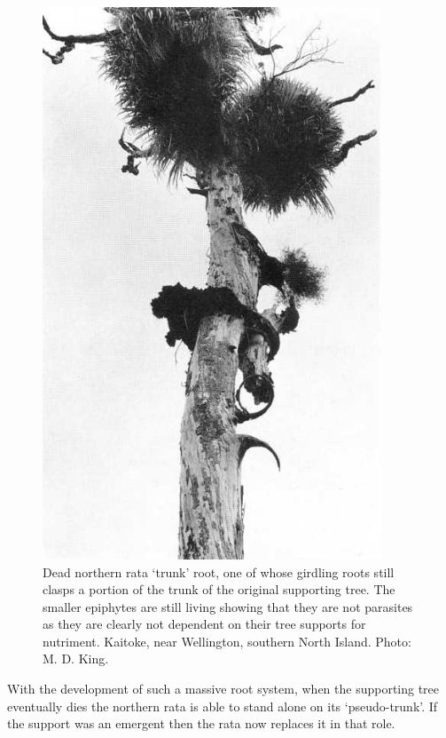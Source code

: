 \begin{figure}[htb]
\begin{minipage}[t]{0.455\textwidth}
    	\includegraphics[width=0.9\textwidth]{graphics/figure53dead-rata.jpg}
    	\caption[Dead northern rata `trunk' root]{Dead northern rata `trunk' root, one of whose girdling roots still clasps a portion of the trunk of the original supporting tree.
    	The smaller epiphytes are still living showing that they are not parasites as they are clearly not dependent on their tree supports for nutriment.
    	Kaitoke, near Wellington, southern North Island.
    	Photo: M. D. King.}%
    	\label{fig:53dead-rata}
	\end{minipage}
\end{figure}

With the development of such a massive root system, when the supporting tree eventually dies the northern rata is able to stand alone on its `pseudo-trunk'.
If the support was an emergent then the rata now replaces it in that role.


